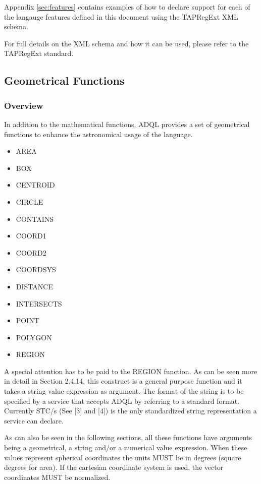 \documentclass[11pt,a4paper]{ivoa}
\begin{document}
Appendix \ref{sec:features} contains examples of how to declare support
for each of the langauge features defined in this document using the
TAPRegExt XML schema.

For full details on the XML schema and how it can be used, please refer to
the TAPRegExt \citep{std:TAPREGEXT} standard.

\subsection{Geometrical Functions}
\label{sec:geom.functions}
\subsubsection{Overview}

In addition to the mathematical functions, ADQL provides a set of geometrical
functions to enhance the astronomical usage of the language.

\begin{itemize}
    \item AREA
    \item BOX
    \item CENTROID
    \item CIRCLE
    \item CONTAINS
    \item COORD1
    \item COORD2
    \item COORDSYS
    \item DISTANCE
    \item INTERSECTS
    \item POINT
    \item POLYGON
    \item REGION
\end{itemize}

A special attention has to be paid to the REGION function. As can be seen more
in detail in Section 2.4.14, this construct is a general purpose function and
it takes a string value expression as argument. The format of the string is
to be specified by a service that accepts ADQL by referring to a standard
format. Currently STC/s (See [3] and [4]) is the only standardized string
representation a service can declare.

As can also be seen in the following sections, all these functions
have arguments being a geometrical, a string and/or a numerical value
expression. When these values represent spherical coordinates the units MUST
be in degrees (square degrees for area). If the cartesian coordinate system
is used, the vector coordinates MUST be normalized.
\end{document}
